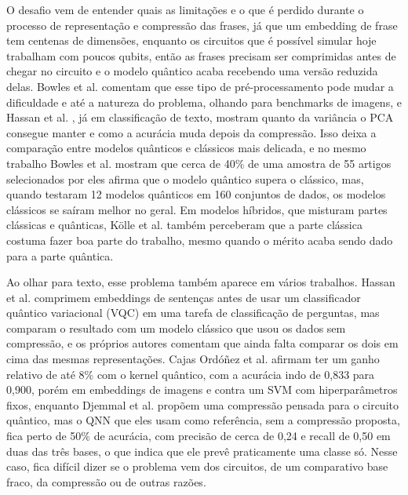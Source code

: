 \documentclass[conference]{IEEEtran}
\begin{document}
O desafio vem de entender quais as limitações e o que é perdido durante o processo de representação e compressão das frases, já que um embedding de frase tem centenas de dimensões, enquanto os circuitos que é possível simular hoje trabalham com poucos qubits, então as frases precisam ser comprimidas antes de chegar no circuito e o modelo quântico acaba recebendo uma versão reduzida delas. Bowles et al. \cite{bowles2024} comentam que esse tipo de pré-processamento pode mudar a dificuldade e até a natureza do problema, olhando para benchmarks de imagens, e Hassan et al. \cite{hassan2026}, já em classificação de texto, mostram quanto da variância o PCA consegue manter e como a acurácia muda depois da compressão. Isso deixa a comparação entre modelos quânticos e clássicos mais delicada, e no mesmo trabalho Bowles et al. mostram que cerca de 40\% de uma amostra de 55 artigos selecionados por eles afirma que o modelo quântico supera o clássico, mas, quando testaram 12 modelos quânticos em 160 conjuntos de dados, os modelos clássicos se saíram melhor no geral. Em modelos híbridos, que misturam partes clássicas e quânticas, Kölle et al. \cite{kolle2024} também perceberam que a parte clássica costuma fazer boa parte do trabalho, mesmo quando o mérito acaba sendo dado para a parte quântica.

Ao olhar para texto, esse problema também aparece em vários trabalhos. Hassan et al. \cite{hassan2026} comprimem embeddings de sentenças antes de usar um classificador quântico variacional (VQC) em uma tarefa de classificação de perguntas, mas comparam o resultado com um modelo clássico que usou os dados sem compressão, e os próprios autores comentam que ainda falta comparar os dois em cima das mesmas representações. Cajas Ordóñez et al. \cite{cajas2025} afirmam ter um ganho relativo de até 8\% com o kernel quântico, com a acurácia indo de 0,833 para 0,900, porém em embeddings de imagens e contra um SVM com hiperparâmetros fixos, enquanto Djemmal et al. \cite{djemmal2025} propõem uma compressão pensada para o circuito quântico, mas o QNN que eles usam como referência, sem a compressão proposta, fica perto de 50\% de acurácia, com precisão de cerca de 0,24 e recall de 0,50 em duas das três bases, o que indica que ele prevê praticamente uma classe só. Nesse caso, fica difícil dizer se o problema vem dos circuitos, de um comparativo base fraco, da compressão ou de outras razões.
\end{document}
